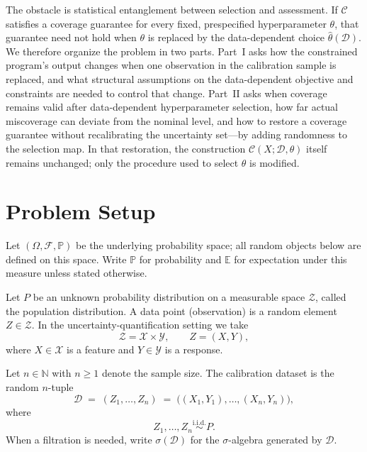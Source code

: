 \documentclass[12pt]{article}
\theoremstyle{plain}
\begin{document}
The obstacle is statistical entanglement between selection and assessment.
If $\mathcal{C}$ satisfies a coverage guarantee for every fixed, prespecified hyperparameter $\theta$, that guarantee need not hold when $\theta$ is replaced by the data-dependent choice $\hat\theta(\mathcal{D})$.
We therefore organize the problem in two parts.
Part~I asks how the constrained program's output changes when one observation in the calibration sample is replaced, and what structural assumptions on the data-dependent objective and constraints are needed to control that change.
Part~II asks when coverage remains valid after data-dependent hyperparameter selection, how far actual miscoverage can deviate from the nominal level, and how to restore a coverage guarantee without recalibrating the uncertainty set---by adding randomness to the selection map.
In that restoration, the construction $\mathcal{C}(X;\mathcal{D},\theta)$ itself remains unchanged; only the procedure used to select $\theta$ is modified.

\section{Problem Setup}
\label{sec:setup}

\label{def:prob-space}
Let $(\Omega,\mathcal{F},\mathbb{P})$ be the underlying probability space; all random objects below are defined on this space.
Write $\mathbb{P}$ for probability and $\mathbb{E}$ for expectation under this measure unless stated otherwise.

\label{def:P}
Let $P$ be an unknown probability distribution on a measurable space $\mathcal{Z}$, called the population distribution.
\label{def:Zi}
A data point (observation) is a random element $Z\in\mathcal{Z}$.
In the uncertainty-quantification setting we take
\[
\mathcal{Z}=\mathcal{X}\times\mathcal{Y},
\qquad
Z=(X,Y),
\]
where $X\in\mathcal{X}$ is a feature and $Y\in\mathcal{Y}$ is a response.

\label{def:D}
Let $n\in\mathbb{N}$ with $n\ge 1$ denote the sample size.
The calibration dataset is the random $n$-tuple
\[
\mathcal{D}
\;=\;
(Z_1,\dots,Z_n)
\;=\;
\bigl((X_1,Y_1),\dots,(X_n,Y_n)\bigr),
\]
where
\[
Z_1,\dots,Z_n
\overset{\mathrm{i.i.d.}}{\sim}
P.
\]
When a filtration is needed, write $\sigma(\mathcal{D})$ for the $\sigma$-algebra generated by $\mathcal{D}$.
\end{document}

